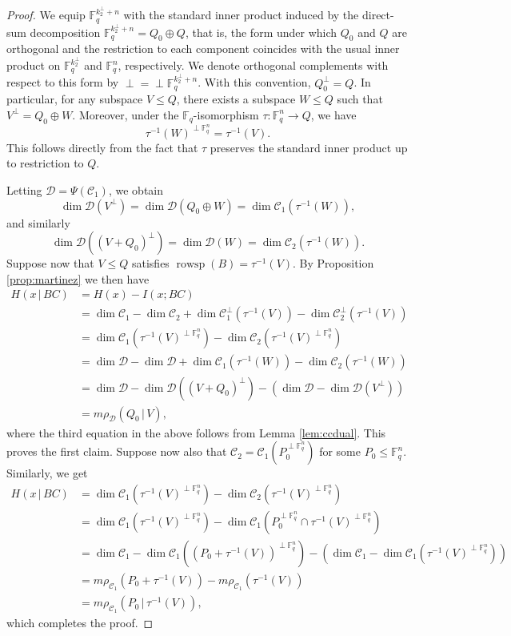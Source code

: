 \documentclass[onecolumn,draftclsnofoot,12pt]{IEEEtran}
\newcommand{\F}{\mathbb{F}}
\newcommand{\C}{\mathcal{C}}
\newcommand{\D}{\mathcal{D}}
\DeclareMathOperator{\rowsp}{rowsp}
\theoremstyle{plain} %
\theoremstyle{definition}
\begin{document}
\begin{proof}
We equip $\F_q^{k_2^\perp + n}$ with the standard inner product induced by the direct-sum decomposition 
$\F_q^{k_2^\perp + n} = Q_0 \oplus Q$, that is, the form under which $Q_0$ and $Q$ are orthogonal and the restriction to each component coincides with the usual inner product on $\F_q^{k_2^\perp}$ and $\F_q^n$, respectively. We denote orthogonal complements with respect to this form by $\perp = {\perp {\F_q^{k_2^\perp + n}}}$. With this convention, $Q_0^\perp = Q$. In particular, for any subspace $V \leq Q$, there exists a subspace $W \leq Q$ such that $V^\perp = Q_0 \oplus W$. Moreover, under the $\F_q$-isomorphism $\tau \colon \F_q^n \to Q$, we have
\[
    \tau^{-1}(W)^{\perp{\F_q^n}} = \tau^{-1}(V).
\]
This follows directly from the fact that $\tau$ preserves the standard inner product up to restriction to $Q$.

Letting $\D = \Psi(\C_1)$, we obtain 
\[\dim \D(V^\perp) = \dim \D(Q_0 \oplus W ) = \dim \C_1(\tau^{-1}(W)),\]
and similarly 
$$\dim \D((V+Q_0)^\perp) = \dim\D(W) = \dim \C_2 (\tau^{-1}(W)).$$ 
Suppose now that $V\leq Q$ satisfies $\rowsp(B) = \tau^{-1}(V)$. By Proposition \ref{prop:martinez} we then have
\begin{align*}
    H(x \,|\, BC) &= H(x) - I(x;BC)\\ 
    &= \dim \C_1 - \dim \C_2 + \dim \C_1^\perp(\tau^{-1}(V))-  \dim \C_2^\perp(\tau^{-1}(V)) \\
    &= \dim \C_1(\tau^{-1}(V)^{\perp\F_q^n}) - \dim \C_2(\tau^{-1}(V)^{\perp \F_q^n}) \\
    &= \dim \D -\dim \D + \dim \C_1(\tau^{-1}(W)) - \dim \C_2(\tau^{-1}(W)) \\ 
    &= \dim \D - \dim \D((V+Q_0)^\perp) -(\dim \D - \dim \D(V^\perp)) \\
    &= m \rho_{\D}(Q_0\,|\,V),
\end{align*}
where the third equation in the above follows from Lemma \ref{lem:ccdual}.
This proves the first claim. Suppose now also that $\C_2= \C_1(P_0^{\perp \F_q^n})$ for some $P_0\leq \F_q^n$. Similarly, we get
\begin{align*}
    H(x \,|\, BC) &= \dim \C_1(\tau^{-1}(V)^{\perp\F_q^n}) - \dim \C_2(\tau^{-1}(V)^{\perp \F_q^n}) \\
    &=  \dim \C_1(\tau^{-1}(V)^{\perp\F_q^n}) - \dim \C_1(P_0^{\perp \F_q^n} \cap \tau^{-1}(V)^{\perp \F_q^n}) \\
    &= \dim \C_1 - \dim \C_1((P_0+ \tau^{-1}(V))^{\perp \F_q^n}) - (\dim \C_1 - \dim \C_1(\tau^{-1}(V)^{\perp\F_q^n})) \\
    &= m \rho_{\C_1}(P_0 + \tau^{-1}(V)) - m \rho_{\C_1}(\tau^{-1}(V)) \\
    &= m \rho_{\C_1}(P_0\,|\, \tau^{-1}(V)),
\end{align*}
which completes the proof.
\end{proof}
\end{document}
